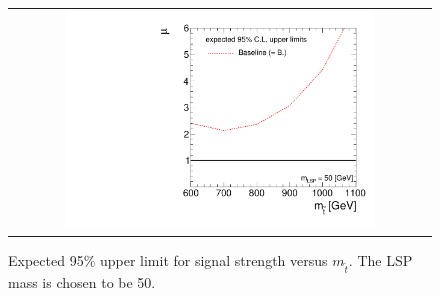 \begin{figure}[!h]
  \centering
  \begin{tabular}{c}
                \includegraphics[width=0.75\textwidth]{figures/limitplot4BinSel_Baseline.pdf} 
  \end{tabular}
  \caption{Expected 95\% upper limit for signal strength versus $m_{\tilde{t}}$. The LSP mass is chosen to be 50\gev.}
  \label{fig:stop_baseline_limit}
\end{figure}

